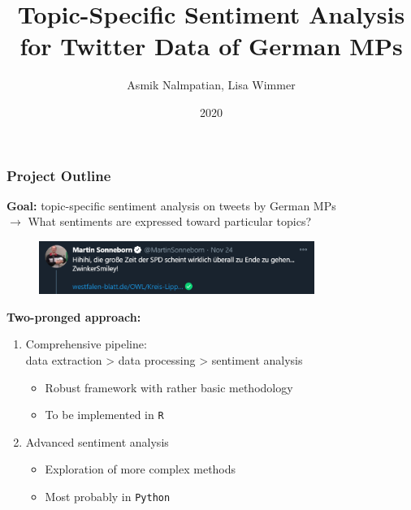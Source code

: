 \documentclass[t]{beamer}
\title{Topic-Specific Sentiment Analysis for Twitter Data of German MPs}
\author{Asmik Nalmpatian, Lisa Wimmer}
\institute{Statistical Consulting}
\date{2020}
\newcommand{\highlight}[1]{\colorbox{gray!20}{#1}}
\begin{document}


\frame{\titlepage}

\footnotesize


\begin{frame}
\frametitle{Project Outline}

\textbf{Goal:} \highlight{topic-specific sentiment analysis} on
tweets by German MPs \\
\smallskip
$\rightarrow$ What sentiments are expressed toward particular topics? \\
  
\begin{figure}
  \raggedright
  \includegraphics[width = 0.8\textwidth]{figures/screenshot_tweet.PNG}
\end{figure}

\textbf{Two-pronged approach:}
\begin{enumerate}
  \footnotesize
  \item Comprehensive \highlight{pipeline}: \\
  data extraction > data processing > sentiment analysis
  \begin{itemize}
    \footnotesize
    \item Robust framework with rather basic methodology
    \item To be implemented in \texttt{R}
  \end{itemize}
  \item \highlight{Advanced} sentiment analysis
  \begin{itemize}
    \footnotesize
    \item Exploration of more complex methods
    \item Most probably in \texttt{Python}
  \end{itemize}
\end{enumerate}

\end{frame}

\end{document}
